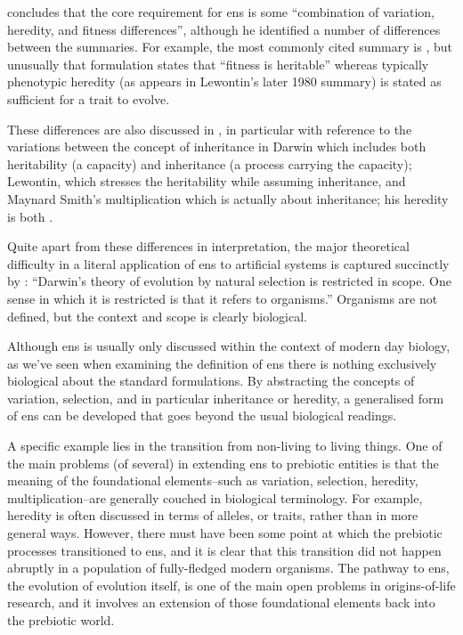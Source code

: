\Textcite{Godfrey-Smith2007} concludes that the core requirement for \gls{ens} is some ``combination of variation, heredity, and fitness differences'', although he identified a number of differences between the summaries. For example, the most commonly cited summary is \textcite{Lewontin:1970mc}, but unusually that formulation states that ``fitness is heritable'' whereas typically phenotypic heredity (as appears in Lewontin's later 1980 summary) is stated as sufficient for a trait to evolve. 

These differences are also discussed in \textcite{Griesemer2001}, in particular with reference to the variations between the concept of inheritance in Darwin which includes both heritability (a capacity) and inheritance (a process carrying the capacity); Lewontin, which stresses the heritability while assuming inheritance, and Maynard Smith's multiplication which is actually about inheritance; his heredity is both \parencite{Griesemer2001}.

Quite apart from these differences in interpretation, the major theoretical difficulty in a literal application of \gls{ens} to artificial systems is captured succinctly by \textcite{Griesemer2005}: ``Darwin's theory of evolution by natural selection is restricted in scope. One sense in which it is restricted is that it refers to organisms.'' Organisms are not defined, but the context and scope is clearly biological. 

Although \gls{ens} is usually only discussed within the context of modern day biology, as we've seen when examining the definition of \gls{ens} there is nothing exclusively biological about the standard formulations. By abstracting the concepts of variation, selection, and in particular inheritance or heredity, a generalised form of \gls{ens} can be developed that goes beyond the usual biological readings. 

A specific example lies in the transition from non-living to living things. One of the main problems (of several) in extending \gls{ens} to prebiotic entities is that the meaning of the foundational elements--such as variation, selection, heredity, multiplication--are generally couched in biological terminology. For example, heredity is often discussed in terms of alleles, or traits, rather than in more general ways. However, there must have been some point at which the prebiotic processes transitioned to \gls{ens}, and it is clear that this transition did not happen abruptly in a population of fully-fledged modern organisms. The pathway to \gls{ens}, the evolution of evolution itself, is one of the main open problems in origins-of-life research, and it involves an extension of those foundational elements back into the prebiotic world.

